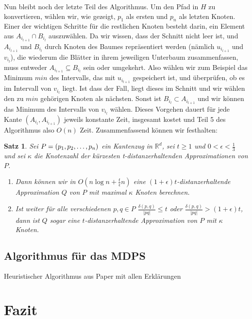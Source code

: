 \documentclass[11pt]{article}
\newcommand{\R}{\mathbb{R}}
\newtheorem{theorem}{Satz}[section]
\begin{document}
    Nun bleibt noch der letzte Teil des Algorithmus. 
    Um den Pfad in $H$ zu konvertieren, wählen wir, wie gezeigt, $p_1$ als ersten und $p_n$ als letzten Knoten. 
    Einer der wichtigen Schritte für die restlichen Knoten besteht darin, ein Element aus $A_{i_{l+1}} \cap B_{i_l}$ auszuwählen. 
    Da wir wissen, dass der Schnitt nicht leer ist, und $A_{i_{l+1}}$ und $B_{i_l}$ durch Knoten des Baumes repräsentiert werden (nämlich $u_{i_{l+1}}$ und $v_{i_l}$), die wiederum die Blätter in ihrem jeweiligen Unterbaum zusammenfassen, muss entweder $A_{i_{l+1}}\subseteq B_{i_l}$ sein oder umgekehrt. 
    Also wählen wir zum Beispiel das Minimum $min$ des Intervalls, das mit $u_{i_{l+1}}$ gespeichert ist, und überprüfen, ob es im Intervall von $v_{i_l}$ liegt. 
    Ist dass der Fall, liegt dieses im Schnitt und wir wählen den zu $min$ gehörigen Knoten als nächsten. Sonst ist $B_{i_l}\subset A_{i_{l+1}}$ und wir können das Minimum des Intervalls von $v_{i_l}$ wählen. Dieses Vorgehen dauert für jede Kante $(A_{i_l}, A_{i_{l+1}})$ jeweils konstante Zeit, insgesamt kostet und Teil 5 des Algorithmus also $O(n)$ Zeit.
    Zusammenfassend können wir festhalten:
    
    \begin{theorem}
    	\label{theo:mvpstime}
    	Sei $P = (p_1, p_2, \mathellipsis, p_n)$ ein Kantenzug in $\R^d$, sei $t \geq 1$ und $0 < \epsilon < \frac{1}{3}$ und sei $\kappa$ die Knotenzahl der kürzesten t-distanzerhaltenden Approximationen von $P$.
    	\begin{enumerate}
    		\item Dann können wir in $O(n \log n + \frac{t}{\epsilon}n)$ eine $(1 + \epsilon)t$-distanzerhaltende Approximation $Q$ von $P$ mit maximal $\kappa$ Knoten berechnen.
    		\item Ist weiter für alle verschiedenen $p, q \in P$ $\frac{\delta(p,q)}{|pq|} \leq t$ oder $\frac{\delta(p,q)}{|pq|} > (1 + \epsilon)t$, dann ist $Q$ sogar eine $t$-distanzerhaltende Approximation von $P$ mit $\kappa$ Knoten.
    	\end{enumerate}
    	
    \end{theorem}
    
    \subsection{Algorithmus für das MDPS}
    \label{subsec:mdps}
    Heuristischer Algorithmus aus Paper mit allen Erklärungen

    \section{Fazit}
    \label{sec:fazit}

    
    
\end{document}
